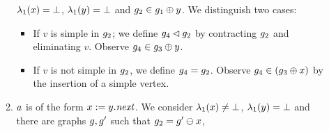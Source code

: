 \begin{enumerate}
\begin{enumerate}
    $\lambda_1(x)=\bot$, %
    $\lambda_1(y)=\bot$ and %
    $g_2\in g_1\oplus{\ensuremath{y}}$.
We distinguish two cases:
\begin{itemize}
\item If $v$ is simple in $g_2$; 
  we define $g_4\lhd g_2$ by contracting $g_2$ and eliminating
  $v$. Observe $g_4\in g_3\oplus{\ensuremath{y}}$.
\item If $v$ is not simple in $g_2$, 
  we define $g_4=g_2$.
  Observe $g_4\in\left(g_3\oplus{\ensuremath{x}}\right)$ by the insertion
  of a simple vertex.
\end{itemize}
\item $a$ is of the form $x:=y.{\it next}$.
%
  We consider 
    $\lambda_1(x)\neq\bot$, %
    $\lambda_1(y)=\bot$ %
    and there are graphs $g,g'$ such that
    $g_2=g'\ominus{\ensuremath{x}}$, %

\end{enumerate}
\end{enumerate}
